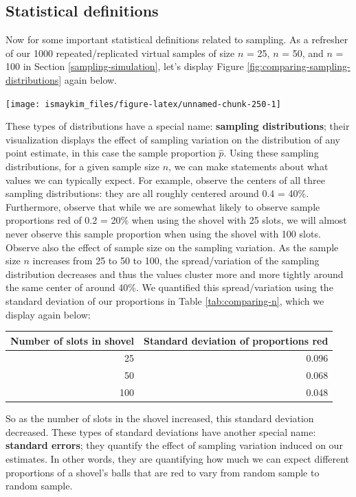 \documentclass[12pt, krantz2,]{krantz}
\begin{document}
\hypertarget{statistical-definitions}{%
\subsection{Statistical definitions}\label{statistical-definitions}}

Now for some important statistical definitions related to sampling. As a refresher of our 1000 repeated/replicated virtual samples of size \(n\) = 25, \(n\) = 50, and \(n\) = 100 in Section \ref{sampling-simulation}, let's display Figure \ref{fig:comparing-sampling-distributions} again below.

\begin{center}\texttt{[image: ismaykim\_files/figure-latex/unnamed-chunk-250-1]} \end{center}

These types of distributions have a special name: \textbf{sampling distributions}; their visualization displays the effect of sampling variation on the distribution of any point estimate, in this case the sample proportion \(\widehat{p}\). Using these sampling distributions, for a given sample size \(n\), we can make statements about what values we can typically expect. For example, observe the centers of all three sampling distributions: they are all roughly centered around 0.4 = 40\%. Furthermore, observe that while we are somewhat likely to observe sample proportions red of 0.2 = 20\% when using the shovel with 25 slots, we will almost never observe this sample proportion when using the shovel with 100 slots. Observe also the effect of sample size on the sampling variation. As the sample size \(n\) increases from 25 to 50 to 100, the spread/variation of the sampling distribution decreases and thus the values cluster more and more tightly around the same center of around 40\%. We quantified this spread/variation using the standard deviation of our proportions in Table \ref{tab:comparing-n}, which we display again below:

\begin{tabular}{r|r}
\hline
Number of slots in shovel & Standard deviation of proportions red\\
\hline
25 & 0.096\\
\hline
50 & 0.068\\
\hline
100 & 0.048\\
\hline
\end{tabular}

So as the number of slots in the shovel increased, this standard deviation decreased. These types of standard deviations have another special name: \textbf{standard errors}; they quantify the effect of sampling variation induced on our estimates. In other words, they are quantifying how much we can expect different proportions of a shovel's balls that are red to vary from random sample to random sample.
\end{document}
